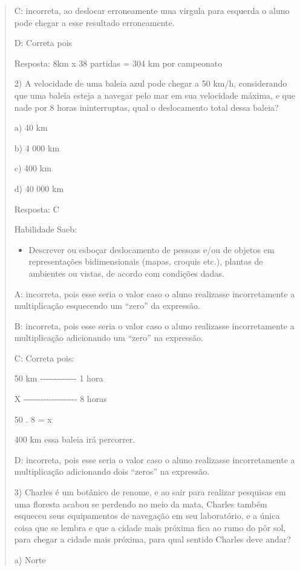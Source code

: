 \begin{quote}
\begin{escolha}
C: incorreta, ao deslocar erroneamente uma virgula para esquerda o aluno
pode chegar a esse resultado erroneamente.

D: Correta pois

Resposta: 8km x 38 partidas = 304 km por campeonato

2) A velocidade de uma baleia azul pode chegar a 50 km/h, considerando
que uma baleia esteja a navegar pelo mar em sua velocidade máxima, e que
nade por 8 horas ininterruptas, qual o deslocamento total dessa baleia?

a) 40 km

b) 4 000 km

c) 400 km

d) 40 000 km

Resposta: C

Habilidade Saeb:

\begin{itemize}
\tightlist
\item
  Descrever ou esboçar deslocamento de pessoas e/ou de objetos em
  representações bidimensionais (mapas, croquis etc.), plantas de
  ambientes ou vistas, de acordo com condições dadas.
\end{itemize}

A: incorreta, pois esse seria o valor caso o aluno realizasse
incorretamente a multiplicação esquecendo um ``zero'' da expressão.

B: incorreta, pois esse seria o valor caso o aluno realizasse
incorretamente a multiplicação adicionando um ``zero'' na expressão.

C: Correta pois:

50 km -\/-\/-\/-\/-\/-\/-\/-\/-\/-\/-\/-\/- 1 hora

X -\/-\/-\/-\/-\/-\/-\/-\/-\/-\/-\/-\/-\/-\/-\/-\/-\/-\/- 8 horas

50 . 8 = x

400 km essa baleia irá percorrer.

D: incorreta, pois esse seria o valor caso o aluno realizasse
incorretamente a multiplicação adicionando dois ``zeros'' na expressão.

3) Charles é um botânico de renome, e ao sair para realizar pesquisas em
uma floresta acabou se perdendo no meio da mata, Charles também esqueceu
seus equipamentos de navegação em seu laboratório, e a única coisa que
se lembra e que a cidade mais próxima fica ao rumo do pôr sol, para
chegar a cidade mais próxima, para qual sentido Charles deve andar?

a) Norte


\end{escolha}
\end{quote}
